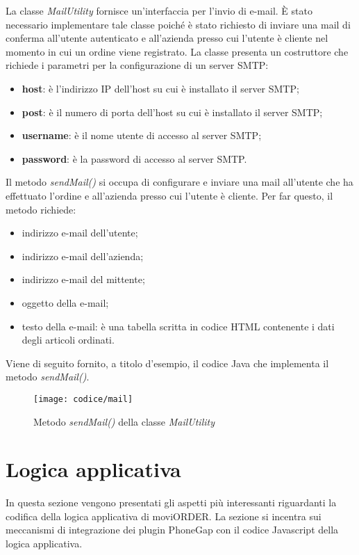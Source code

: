 La classe \textit{MailUtility} fornisce un'interfaccia per l'invio di e-mail. È stato necessario implementare tale classe poiché è stato richiesto di inviare una mail di conferma all'utente autenticato e all'azienda presso cui l'utente è cliente nel momento in cui un ordine viene registrato. La classe presenta un costruttore che richiede i parametri per la configurazione di un server SMTP:
\begin{itemize}
	\item \textbf{host}: è l'indirizzo IP dell'host su cui è installato il server SMTP;
	\item \textbf{post}: è il numero di porta dell'host su cui è installato il server SMTP;
	\item \textbf{username}: è il nome utente di accesso al server SMTP;
	\item \textbf{password}: è la password di accesso al server SMTP.
\end{itemize}
Il metodo \textit{sendMail()} si occupa di configurare e inviare una mail all'utente che ha effettuato l'ordine e all'azienda presso cui l'utente è cliente. Per far questo, il metodo richiede:
\begin{itemize}
	\item indirizzo e-mail dell'utente;
	\item indirizzo e-mail dell'azienda;
	\item indirizzo e-mail del mittente;
	\item oggetto della e-mail;
	\item testo della e-mail: è una tabella scritta in codice HTML contenente i dati degli articoli ordinati.
\end{itemize}
Viene di seguito fornito, a titolo d'esempio, il codice Java che implementa il metodo \textit{sendMail()}.

\newpage

\begin{figure}[!h] 
    \centering 
    \texttt{[image: codice/mail]} 
    \caption{Metodo \textit{sendMail()} della classe \textit{MailUtility}}
\end{figure}

\section{Logica applicativa}

In questa sezione vengono presentati gli aspetti più interessanti riguardanti la codifica della logica applicativa di moviORDER. La sezione si incentra sui meccanismi di integrazione dei plugin PhoneGap con il codice Javascript della logica applicativa.

